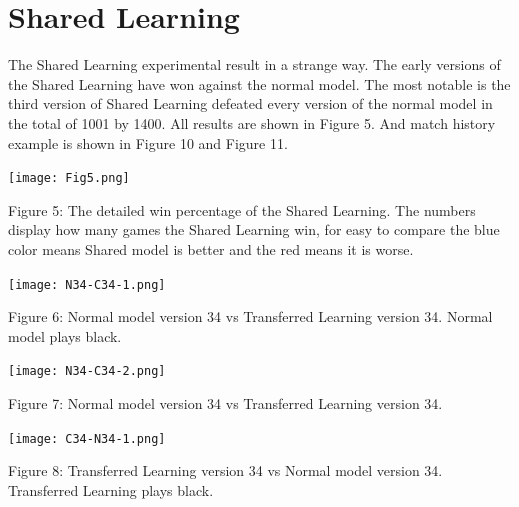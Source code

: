 \documentclass[12pt,a4paper]{report}
\begin{document}
\section{Shared Learning}
\hspace{0.6cm}The Shared Learning experimental result in a strange way. The early versions of the Shared Learning have won against the normal model. The most notable is the third version of Shared Learning defeated every version of the normal model in the total of 1001 by 1400. All results are shown in Figure 5. And match history example is shown in Figure 10 and Figure 11.
\begin{center}
\texttt{[image: Fig5.png]}\par
\end{center}
\begin{small}
Figure 5: The detailed win percentage of the Shared Learning. The numbers display how many games the Shared Learning win, for easy to compare the blue color means Shared model is better and the red means it is worse.\par
\end{small}
\clearpage

\begin{center}
\texttt{[image: N34-C34-1.png]}\par
\end{center}
\begin{small}
Figure 6: Normal model version 34 vs Transferred Learning version 34. Normal model plays black.\par
\end{small}
\clearpage

\begin{center}
\texttt{[image: N34-C34-2.png]}\par
\end{center}
\begin{small}
Figure 7: Normal model version 34 vs Transferred Learning version 34.\par
\end{small}
\clearpage
\begin{center}
\texttt{[image: C34-N34-1.png]}\par
\end{center}
\begin{small}
Figure 8: Transferred Learning version 34 vs Normal model version 34. Transferred Learning plays black.\par
\end{small}
\clearpage
\end{document}

